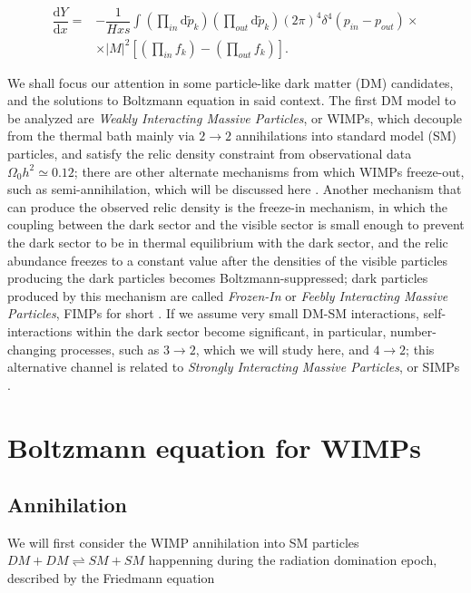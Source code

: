\documentclass[final,5p,times,twocolumn, nopreprintline]{elsarticle}
\numberwithin{equation}{section}
\begin{document}
\begin{align}
\dfrac{\mathrm{d}Y}{\mathrm{d}x}=&-\dfrac{1}{Hxs}\int\left(\prod_{in}\mathrm{d}\tilde{p}_k\right)\left(\prod_{out}\mathrm{d}\tilde{p}_k\right)(2\pi)^4\delta^4(p_{in}-p_{out})\times\nonumber\\&\times|M|^2\left[\left(\prod_{in}f_k\right)-\left(\prod_{out}f_k\right)\right]. \label{eq:collision_sim}
\end{align}

We shall focus our attention in some particle-like dark matter (DM) candidates, and the solutions to Boltzmann equation in said context. The first DM model to be analyzed are \emph{Weakly Interacting Massive Particles}, or WIMPs, which decouple from the thermal bath mainly via $2\rightarrow2$ annihilations into standard model (SM) particles, and satisfy the relic density constraint from observational data $\Omega_0 h^2\simeq0.12$; there are other alternate mechanisms from which WIMPs freeze-out, such as semi-annihilation, which will be discussed here \cite{bhattacharya2020simpler}. Another mechanism that can produce the observed relic density is the freeze-in mechanism, in which the coupling between the dark sector and the visible sector is small enough to prevent the dark sector to be in thermal equilibrium with the dark sector, and the relic abundance freezes to a constant value after the densities of the visible particles producing the dark particles becomes Boltzmann-suppressed; dark particles produced by this mechanism are called \emph{Frozen-In} or \emph{Feebly Interacting Massive Particles}, FIMPs for short \cite{bernal2017dawn}. If we assume very small DM-SM interactions, self-interactions within the dark sector become significant, in particular, number-changing processes, such as $3\to2$, which we will study here, and $4\to2$; this alternative channel is related to \emph{Strongly Interacting Massive Particles}, or SIMPs \cite{bhattacharya2020simpler}.

\section{Boltzmann equation for WIMPs}

\subsection{Annihilation}

We will first consider the WIMP annihilation into SM particles $DM+DM\rightleftharpoons SM+SM$ happenning during the radiation domination epoch, described by the Friedmann equation
\end{document}
